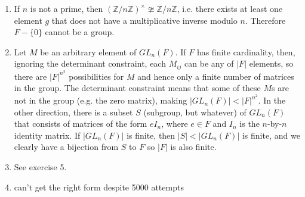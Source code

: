 \documentclass[]{article}
\newcommand{\abs}[1]{\left\vert #1 \right\vert}
\newcommand{\bbz}{\mathbb{Z}}
\begin{document}
\begin{enumerate}
\item If $n$ is not a prime, then $(\bbz/n\bbz)^\times \ncong \bbz/n\bbz$, i.e. there exists at least one element $g$ that does not have a multiplicative inverse modulo $n$. Therefore $F - \{0\}$ cannot be a group.


\item Let $M$ be an arbitrary element of $GL_n(F)$. If $F$ has finite cardinality, then, ignoring the determinant constraint, each $M_{ij}$ can be any of $\abs{F}$ elements, so there are $\abs{F}^{n^2}$ possibilities for $M$ and hence only a finite number of matrices in the group. The determinant constraint means that some of these $M$s are not in the group (e.g. the zero matrix), making $\abs{GL_n(F)} < \abs{F}^{n^2}$. In the other direction, there is a subset $S$ (subgroup, but whatever) of $GL_n(F)$ that consists of matrices of the form $eI_n$, where $e\in F$ and $I_n$ is the $n$-by-$n$ identity matrix. If $\abs{GL_n(F)}$ is finite, then $\abs{S} < \abs{GL_n(F)}$ is finite, and we clearly have a bijection from $S$ to $F$ so $\abs{F}$ is also finite.


\item See exercise 5.


\item {\color{red} can't get the right form despite 5000 attempts}



\end{enumerate}
\end{document}
